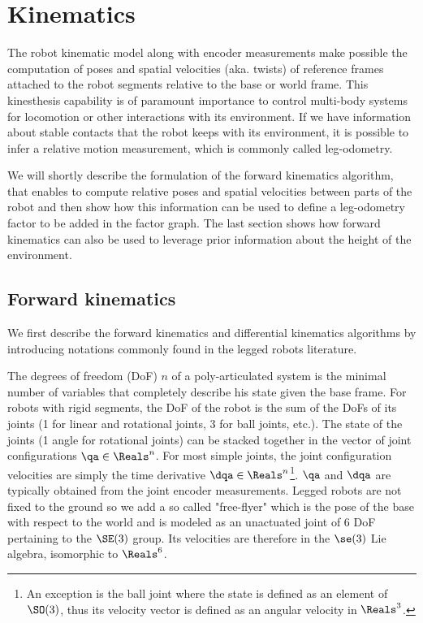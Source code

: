 \chapter{Kinematics}
\minitoc
\bigskip

The robot kinematic model along with encoder measurements make possible the computation of poses and spatial velocities \cite{featherstone2014rigid} (aka. twists) 
of reference frames attached to the robot segments relative to the base or world frame. This kinesthesis capability is of paramount importance to control
multi-body systems for locomotion or other interactions with its environment. If we have information about stable contacts that the robot keeps with
its environment, it is possible to infer a relative motion measurement, which is commonly called leg-odometry.

We will shortly describe the formulation of the forward kinematics algorithm, that enables to compute relative poses and spatial velocities between parts of the robot
and then show how this information can be used to define a leg-odometry factor to be added in the factor graph. The last section shows how forward kinematics can also be used to leverage prior 
information about the height of the environment. 



\section{Forward kinematics}
\label{sec:forward_kinematics}
We first describe the forward kinematics and differential kinematics algorithms by introducing notations commonly found in the legged robots literature.

The degrees of freedom (DoF) $n$ of a poly-articulated system is the minimal number of variables that completely describe his state given the base frame. 
For robots with rigid segments, the DoF of the robot is the sum of the DoFs of its joints (1 for linear and rotational joints, 3 for
ball joints, etc.).
The state of the joints (1 angle for rotational joints) can be stacked together in the vector of joint configurations 
$\qa \in \Reals^n$. For most simple joints, the joint configuration velocities are simply the time derivative $\dqa \in \Reals^n$\footnote{An exception is the ball joint where the 
state is defined as an element of $\SO(3)$, thus its velocity vector is defined as an angular velocity in $\Reals^3$.}. $\qa$ and $\dqa$ are typically obtained from
the joint encoder measurements.
Legged robots are not fixed to the ground so we add a so called "free-flyer" which is the pose of the base with respect to the world and is modeled as an unactuated joint of 6 DoF pertaining to the $\SE(3)$ group. Its velocities are therefore in the $\se(3)$  Lie algebra, isomorphic to $\Reals^6$. 

